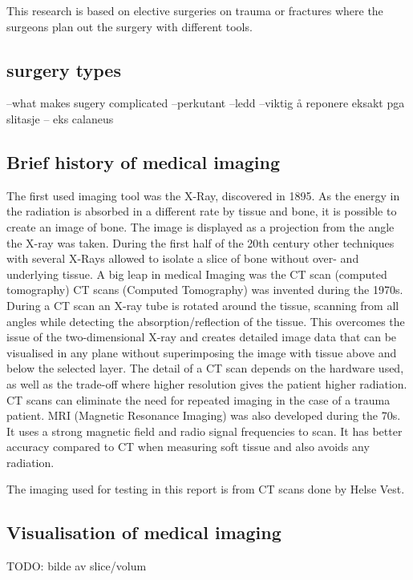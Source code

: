 \documentclass[a4paper]{report}
\begin{document}
This research is based on elective surgeries on trauma or fractures where the surgeons plan out the surgery with different tools. 

\subsection{surgery types}
--what makes sugery complicated
--perkutant
--ledd
--viktig å reponere eksakt pga slitasje
-- eks calaneus

\subsection{Brief history of medical imaging}
The first used imaging tool was the X-Ray, discovered in 1895\cite{hamblen_outline_2010}\cite{suetens_fundamentals_2017}. As the energy in the radiation is absorbed in a different rate by tissue and bone, it is possible to create an image of bone. The image is displayed as a projection from the angle the X-ray was taken. During the first half of the 20th century other techniques with several X-Rays allowed to isolate a slice of bone without over- and underlying tissue. A big leap in medical Imaging was the CT scan (computed tomography)\cite{bradley_history_2008}
CT scans (Computed Tomography) was invented during the 1970s. During a CT scan an X-ray tube is rotated around the tissue, scanning from all angles while detecting the absorption/reflection of the tissue. This overcomes the issue of the two-dimensional X-ray and creates detailed image data that can be visualised in any plane without superimposing the image with tissue above and below the selected layer\cite{hamblen_outline_2010}. The detail of a CT scan depends on the hardware used, as well as the trade-off where higher resolution gives the patient higher radiation\cite{bradley_history_2008}. CT scans can eliminate the need for repeated imaging in the case of a trauma patient\cite{swiontkowski_manual_2013}.
MRI (Magnetic Resonance Imaging) was also developed during the 70s. It uses a strong magnetic field and radio signal frequencies to scan. It has better accuracy compared to CT when measuring soft tissue and also avoids any radiation.


The imaging used for testing in this report is from CT scans done by Helse Vest.
\subsection{Visualisation of medical imaging}
TODO: bilde av slice/volum
\end{document}
